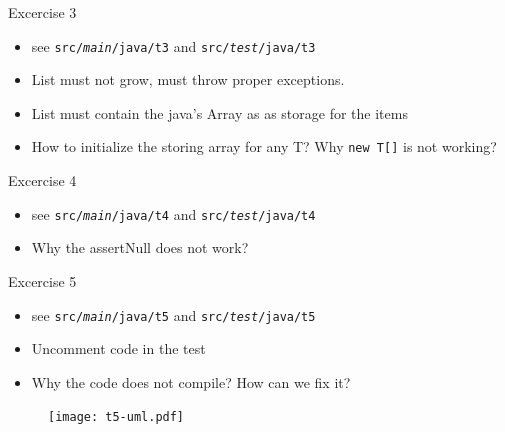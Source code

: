 \documentclass{beamer}
\begin{document}
\begin{frame}{Excercise 3}

\begin{itemize}
    \item see \texttt{src/\textit{main}/java/t3} and \texttt{src/\textit{test}/java/t3}
    \item List must not grow, must throw proper exceptions.
    \item List must contain the java's Array as as storage for the items
    \item How to initialize the storing array for any T? Why \texttt{new T[]} is not working?
\end{itemize}
\end{frame}

\begin{frame}{Excercise 4}

\begin{itemize}
    \item see \texttt{src/\textit{main}/java/t4} and \texttt{src/\textit{test}/java/t4}
    \item Why the assertNull does not work?
\end{itemize}
\end{frame}

\begin{frame}{Excercise 5}

\begin{itemize}
    \item see \texttt{src/\textit{main}/java/t5} and \texttt{src/\textit{test}/java/t5}
    \item Uncomment code in the test
    \item Why the code does not compile? How can we fix it?
\end{itemize}
    \begin{figure}[htbp]
    \centering
        \texttt{[image: t5-uml.pdf]}
    \label{fig:t5-uml}
    \end{figure}
\end{frame}
\end{document}

